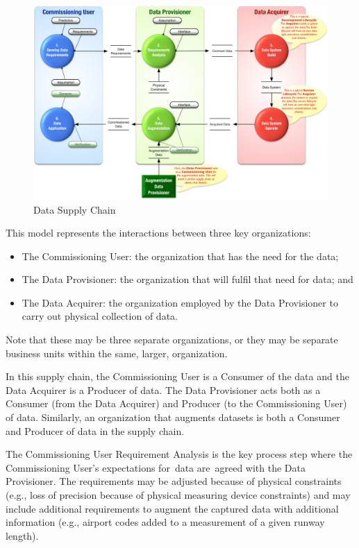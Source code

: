 \begin{figure}[htbp]
  \centering
  \includegraphics[width=\textwidth]{images/dataacquisitionlifecycleflat}
  \caption{Data Supply Chain}
  \label{fig:dataacquisitionlifecycle}
\end{figure}

This model represents the interactions between three key organizations:
\begin{itemize}
  \item The Commissioning User: the organization that has the need for the data;
  \item The Data Provisioner: the organization that will fulfil that need for data; and
  \item The Data Acquirer: the organization employed by the Data Provisioner to carry out physical collection of data.
\end{itemize}

Note that these may be three separate organizations, or they may be separate business units within the same, larger, organization.

In this supply chain, the Commissioning User is a Consumer of the data and the Data Acquirer is a Producer of data. The Data Provisioner acts both as a Consumer (from the Data Acquirer) and Producer (to the Commissioning User) of data. Similarly, an organization that augments \glspl{dataset} is both a Consumer and Producer of data in the supply chain.

The Commissioning User Requirement Analysis is the key process step where the Commissioning User's expectations for\cbstart\ data are\cbend\ agreed with the Data Provisioner. The requirements may be adjusted because of physical constraints (e.g., loss of precision because of physical measuring device constraints) and may include additional requirements to augment the captured data with additional \gls{information} (e.g., airport codes added to a measurement of a given runway length).

